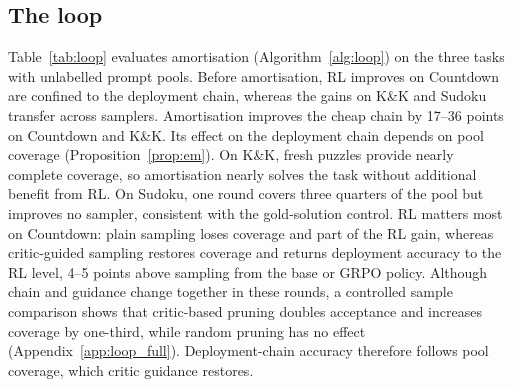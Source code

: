 


\begin{table}[!h]
\centering\small
\caption{Held-out accuracy (\%) under the cheap and the deployment chain; bold: more than a point above the start. More in Appendix~\ref{app:loop_full}.}
\label{tab:loop}
\end{table}


\subsection{The loop}
\label{sec:exp_loop}
Table~\ref{tab:loop} evaluates amortisation (Algorithm~\ref{alg:loop}) on the three tasks with unlabelled prompt pools. Before amortisation, RL improves on Countdown are confined to the deployment chain, whereas the gains on K\&K and Sudoku transfer across samplers. Amortisation improves the cheap chain by 17--36 points on Countdown and K\&K. Its effect on the deployment chain depends on pool coverage (Proposition~\ref{prop:em}). On K\&K, fresh puzzles provide nearly complete coverage, so amortisation nearly solves the task without additional benefit from RL. On Sudoku, one round covers three quarters of the pool but improves no sampler, consistent with the gold-solution control. RL matters most on Countdown: plain sampling loses coverage and part of the RL gain, whereas critic-guided sampling restores coverage and returns deployment accuracy to the RL level, 4--5 points above sampling from the base or GRPO policy. Although chain and guidance change together in these rounds, a controlled sample comparison shows that critic-based pruning doubles acceptance and increases coverage by one-third, while random pruning has no effect (Appendix~\ref{app:loop_full}). Deployment-chain accuracy therefore follows pool coverage, which critic guidance restores.

